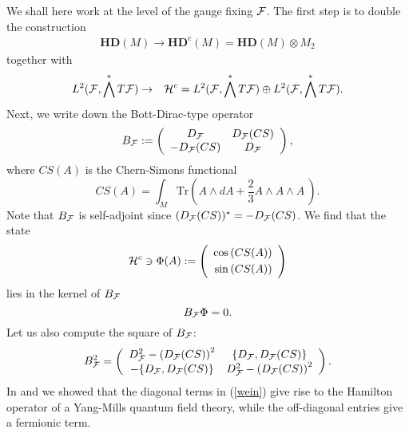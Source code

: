 \documentclass[letterpaper,12pt]{article}
\newcommand{\nn}{\nonumber}
\def\cf{{\cal F}}
\def\ch{{\cal H}}
\begin{document}
We shall here work at the level of the gauge fixing $\cf$.  The first step is to double the construction
\begin{eqnarray}
\mathbf{HD}(M) \longrightarrow \mathbf{HD}^c(M) =  \mathbf{HD}(M)\otimes M_2
\label{HDC}
\end{eqnarray}
together with
\begin{eqnarray}
L^2(\cf,\bigwedge^* T\cf) &\rightarrow& 
\ch^c =
L^2(\cf,\bigwedge^* T\cf) \oplus L^2(\cf,\bigwedge^* T\cf)\nn.
\end{eqnarray}
Next, we write down the Bott-Dirac-type operator
\begin{eqnarray}
B_\cf :=   \left(
\begin{array}{cc}
 D_\cf  &  D_\cf(CS)  \\ 
 -D_\cf(CS)   &  D_\cf
\end{array}
\right),
\label{BDx2}
\end{eqnarray}
where $CS(A)$ is the Chern-Simons functional
\begin{equation}
CS(A) =  \int_M \mbox{Tr} \left( {A}\wedge d{A} + \frac{2}{3} {A}\wedge {A} \wedge {A}\  \right).
\label{CS}
\end{equation}
Note that $B_\cf$ is self-adjoint since $(D_\cf(CS))^*=-D_\cf(CS)$. We find that the state  
\begin{equation}
\ch^c \ni \Phi (A) := \left(
\begin{array}{r}
\cos \left(   CS(A)\right)   
\vspace{0,1cm}
\\
 \sin\left(  CS(A)\right)   
\end{array}
\right) 
\label{platter}
\end{equation}
lies in the kernel of $B_\cf$
$$
B_\cf \Phi =0.
$$
Let us also compute the square of $B_\cf$:
\begin{equation}
B_\cf^2 =
\left(
\begin{array}{cc}
D_\cf^2 - \left(D_\cf(CS)\right)^2  & \{D_\cf, D_\cf(CS)\}
\\
-\{D_\cf, D_\cf(CS)\} & D_\cf^2 - \left(D_\cf(CS)\right)^2
\end{array}
\right).
\label{wein}
\end{equation}
In \cite{Aastrup:2019yui} and \cite{Aastrup:2020jcf} we showed that the diagonal terms in (\ref{wein}) give rise to the Hamilton operator of a Yang-Mills quantum field theory, while the off-diagonal entries give a fermionic term.
\end{document}
